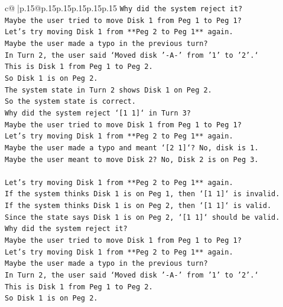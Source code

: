 \documentclass{article}
\begin{document}
{\begin{supertabular}{c@{$\;$}|p{.15\linewidth}@{}p{.15\linewidth}p{.15\linewidth}p{.15\linewidth}p{.15\linewidth}p{.15\linewidth}}
{{{\texttt{Why did the system reject it?} \\
\texttt{Maybe the user tried to move Disk 1 from Peg 1 to Peg 1?} \\
\texttt{Let's try moving Disk 1 from **Peg 2 to Peg 1** again.} \\
\texttt{Maybe the user made a typo in the previous turn?} \\
\texttt{In Turn 2, the user said `Moved disk '{-}A{-}' from '1' to '2'.`} \\
\texttt{This is Disk 1 from Peg 1 to Peg 2.} \\
\texttt{So Disk 1 is on Peg 2.} \\
\texttt{The system state in Turn 2 shows Disk 1 on Peg 2.} \\
\texttt{So the system state is correct.} \\
\texttt{Why did the system reject `{[}1 1{]}` in Turn 3?} \\
\texttt{Maybe the user tried to move Disk 1 from Peg 1 to Peg 1?} \\
\texttt{Let's try moving Disk 1 from **Peg 2 to Peg 1** again.} \\
\texttt{Maybe the user made a typo and meant `{[}2 1{]}`? No, disk is 1.} \\
\texttt{Maybe the user meant to move Disk 2? No, Disk 2 is on Peg 3.} \\
\\ 
\texttt{Let's try moving Disk 1 from **Peg 2 to Peg 1** again.} \\
\texttt{If the system thinks Disk 1 is on Peg 1, then `{[}1 1{]}` is invalid.} \\
\texttt{If the system thinks Disk 1 is on Peg 2, then `{[}1 1{]}` is valid.} \\
\texttt{Since the state says Disk 1 is on Peg 2, `{[}1 1{]}` should be valid.} \\
\texttt{Why did the system reject it?} \\
\texttt{Maybe the user tried to move Disk 1 from Peg 1 to Peg 1?} \\
\texttt{Let's try moving Disk 1 from **Peg 2 to Peg 1** again.} \\
\texttt{Maybe the user made a typo in the previous turn?} \\
\texttt{In Turn 2, the user said `Moved disk '{-}A{-}' from '1' to '2'.`} \\
\texttt{This is Disk 1 from Peg 1 to Peg 2.} \\
\texttt{So Disk 1 is on Peg 2.} \\
}}}
\end{supertabular}}
\end{document}
